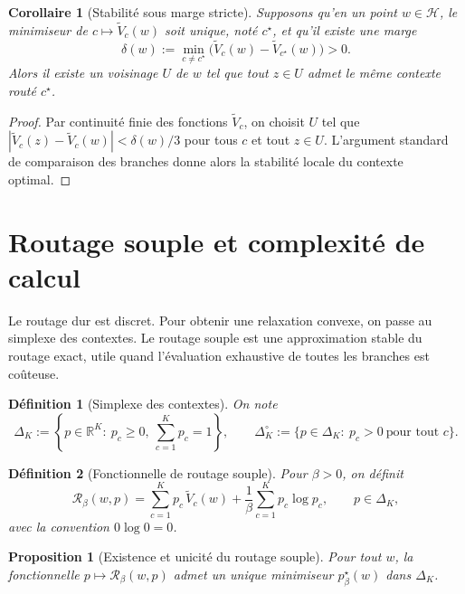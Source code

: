 \documentclass[11pt,a4paper]{article}
\newtheorem{definition}{Définition}[section]
\newtheorem{proposition}{Proposition}[section]
\newtheorem{corollary}{Corollaire}[section]
\newcommand{\R}{\mathbb R}
\newcommand{\Hh}{\mathcal H}
\newcommand{\Rcal}{\mathcal R}
\begin{document}
\begin{corollary}[Stabilité sous marge stricte]
Supposons qu'en un point \(w\in\Hh\), le minimiseur de \(c\mapsto\widetilde V_c(w)\) soit unique, noté \(c^\star\), et qu'il existe une marge
\[
\delta(w):=\min_{c\neq c^\star}\bigl(\widetilde V_c(w)-\widetilde V_{c^\star}(w)\bigr)>0.
\]
Alors il existe un voisinage \(U\) de \(w\) tel que tout \(z\in U\) admet le même contexte routé \(c^\star\).
\end{corollary}

\begin{proof}
Par continuité finie des fonctions \(\widetilde V_c\), on choisit \(U\) tel que \(|\widetilde V_c(z)-\widetilde V_c(w)|<\delta(w)/3\) pour tous \(c\) et tout \(z\in U\). L'argument standard de comparaison des branches donne alors la stabilité locale du contexte optimal.
\end{proof}

\section{Routage souple et complexité de calcul}

Le routage dur est discret. Pour obtenir une relaxation convexe, on passe au simplexe des contextes. Le routage souple est une approximation stable du routage exact, utile quand l'évaluation exhaustive de toutes les branches est coûteuse.

\begin{definition}[Simplexe des contextes]
On note
\[
\Delta_K:=\left\{p\in\R^K:\ p_c\ge 0,\ \sum_{c=1}^K p_c=1\right\},
\qquad
\Delta_K^\circ:=\{p\in\Delta_K:\ p_c>0\ \text{pour tout }c\}.
\]
\end{definition}

\begin{definition}[Fonctionnelle de routage souple]
Pour \(\beta>0\), on définit
\[
\Rcal_\beta(w,p)
=
\sum_{c=1}^K p_c\,\widetilde V_c(w)
+\frac{1}{\beta}\sum_{c=1}^K p_c\log p_c,
\qquad p\in\Delta_K,
\]
avec la convention \(0\log 0=0\).
\end{definition}

\begin{proposition}[Existence et unicité du routage souple]
Pour tout \(w\), la fonctionnelle \(p\mapsto \Rcal_\beta(w,p)\) admet un unique minimiseur \(p^\star_\beta(w)\) dans \(\Delta_K\).
\end{proposition}
\end{document}
